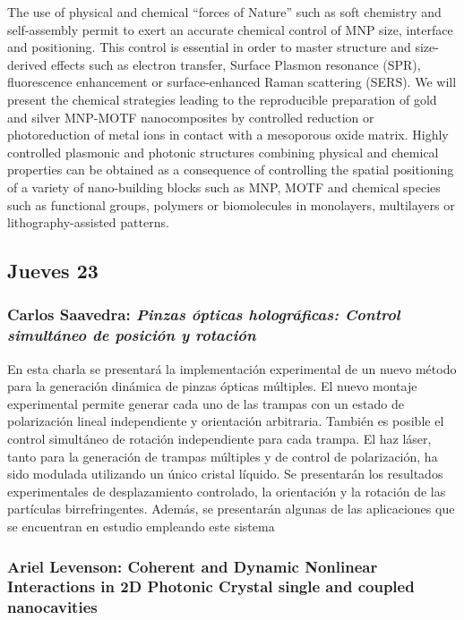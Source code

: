 The use of physical and chemical ``forces of Nature'' such as soft chemistry and
self-assembly permit to exert an accurate chemical control of MNP size,
interface and positioning. This control is essential in order to master
structure and size-derived effects such as electron transfer, Surface Plasmon
resonance (SPR), fluorescence enhancement or surface-enhanced Raman
scattering (SERS). We will present the chemical strategies leading to the
reproducible preparation of gold and silver MNP-MOTF nanocomposites by
controlled reduction or photoreduction of metal ions in contact with a
mesoporous oxide matrix. Highly controlled plasmonic and photonic structures
combining physical and chemical properties can be obtained as a consequence of
controlling the spatial positioning of a variety of nano-building blocks such as
MNP, MOTF and chemical species such as functional groups, polymers or
biomolecules in monolayers, multilayers or lithography-assisted patterns.

\subsection*{Jueves 23}

\subsubsection*{Carlos Saavedra: \textit{Pinzas \'opticas hologr\'aficas:
Control simult\'aneo de posici\'on y rotaci\'on}}

En esta charla se presentar\'a la implementaci\'on experimental de un nuevo
m\'etodo para la generaci\'on din\'amica de pinzas \'opticas m\'ultiples. El
nuevo montaje experimental permite generar cada uno de las trampas con un estado
de polarizaci\'on lineal independiente y orientaci\'on arbitraria. Tambi\'en es
posible el control simult\'aneo de rotaci\'on independiente para cada trampa. El
haz l\'aser, tanto para la generaci\'on de trampas  m\'ultiples y de control de
polarizaci\'on, ha sido modulada utilizando un \'unico cristal l\'iquido. Se
presentar\'an los resultados experimentales de desplazamiento controlado, la
orientaci\'on y la rotaci\'on de las part\'iculas birrefringentes. Adem\'as, se
presentar\'an algunas de las aplicaciones que se encuentran en estudio empleando
este sistema

\subsubsection*{Ariel Levenson: Coherent and Dynamic Nonlinear Interactions in
2D Photonic Crystal single and coupled nanocavities}

